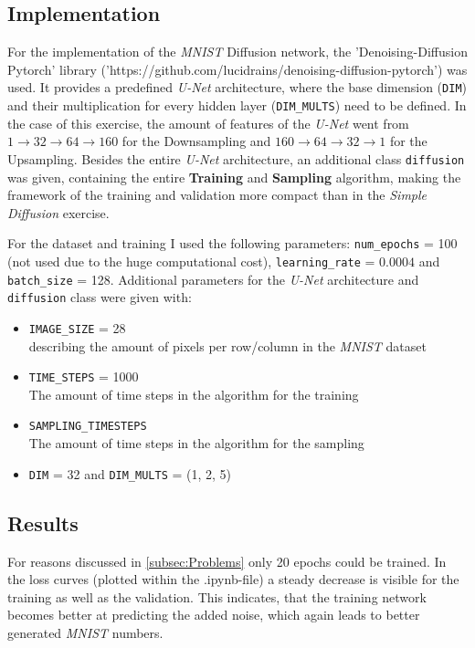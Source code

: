 

\setlength{\parindent}{0em}



\subsection{Implementation}
For the implementation of the \textit{MNIST} Diffusion network, the 'Denoising-Diffusion Pytorch' library ('https://github.com/lucidrains/denoising-diffusion-pytorch') was used.
It provides a predefined \textit{U-Net} architecture, where the base dimension (\texttt{DIM}) and their multiplication for every hidden layer (\texttt{DIM\_MULTS}) need to be defined.
In the case of this exercise, the amount of features of the \textit{U-Net} went from $1 \rightarrow 32 \rightarrow 64 \rightarrow 160$ for the Downsampling and $160 \rightarrow 64 \rightarrow 32 \rightarrow 1$ for the Upsampling.
Besides the entire \textit{U-Net} architecture, an additional class \texttt{diffusion} was given, containing the entire \textbf{Training} and \textbf{Sampling} algorithm, making the framework of the training and validation more compact than in the \textit{Simple Diffusion} exercise.

For the dataset and training I used the following parameters: \texttt{num\_epochs} = 100 (not used due to the huge computational cost), \texttt{learning\_rate} = $0.0004$ and \texttt{batch\_size} = 128.
Additional parameters for the \textit{U-Net} architecture and \texttt{diffusion} class were given with:
\begin{itemize}
  \item \texttt{IMAGE\_SIZE} = 28\\
  describing the amount of pixels per row/column in the \textit{MNIST} dataset 
  \item \texttt{TIME\_STEPS} = 1000\\
  The amount of time steps in the algorithm for the training
  \item \texttt{SAMPLING\_TIMESTEPS}\\
  The amount of time steps in the algorithm for the sampling
  \item \texttt{DIM} = 32 and \texttt{DIM\_MULTS} = (1, 2, 5)
\end{itemize}

\subsection{Results}
For reasons discussed in \autoref{subsec:Problems} only 20 epochs could be trained. In the loss curves (plotted within the .ipynb-file) a steady decrease is visible for the training as well as the validation.
This indicates, that the training network becomes better at predicting the added noise, which again leads to better generated \textit{MNIST} numbers.

